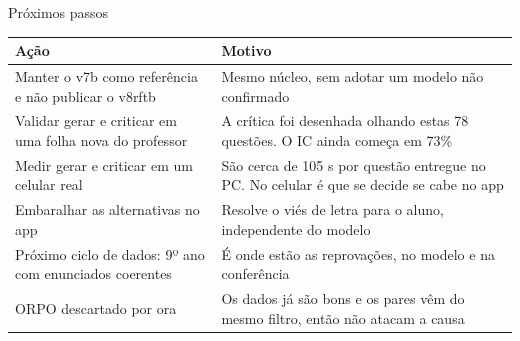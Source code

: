 \documentclass[aspectratio=169,11pt]{beamer}
\begin{document}
\begin{frame}{Próximos passos}
  \centering
  \vspace{4pt}

  \footnotesize
  \begin{tabularx}{\textwidth}{@{}>{\raggedright\arraybackslash}p{5.6cm}X@{}}
    \toprule
    Ação & Motivo \\
    \midrule
    Manter o v7b como referência e não publicar o v8rftb & Mesmo núcleo, sem adotar um modelo não confirmado \\
    Validar gerar e criticar em uma folha nova do professor & A crítica foi desenhada olhando estas 78 questões. O IC ainda começa em 73\% \\
    Medir gerar e criticar em um celular real & São cerca de 105 s por questão entregue no PC. No celular é que se decide se cabe no app \\
    Embaralhar as alternativas no app & Resolve o viés de letra para o aluno, independente do modelo \\
    Próximo ciclo de dados: 9º ano com enunciados coerentes & É onde estão as reprovações, no modelo e na conferência \\
    ORPO descartado por ora & Os dados já são bons e os pares vêm do mesmo filtro, então não atacam a causa \\
    \bottomrule
  \end{tabularx}
\end{frame}
\end{document}
